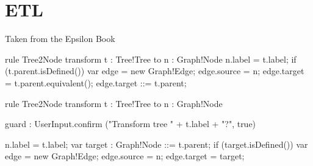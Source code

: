 \chapter{ETL}

Taken from the Epsilon Book

\begin{etl}
rule Tree2Node
    transform t : Tree!Tree
    to n : Graph!Node {
    n.label = t.label;
    if (t.parent.isDefined()) {
        var edge = new Graph!Edge;
        edge.source = n;
        edge.target = t.parent.equivalent();
        edge.target ::= t.parent;
    }
}
\end{etl}

\begin{etl}
rule Tree2Node
    transform t : Tree!Tree
    to n : Graph!Node {
        
        guard : UserInput.confirm ("Transform tree " + t.label + "?", true)
        
        n.label = t.label;
        var target : Graph!Node ::= t.parent;
        if (target.isDefined()) {
            var edge = new Graph!Edge;
            edge.source = n;
            edge.target = target;
        }
    }
\end{etl}